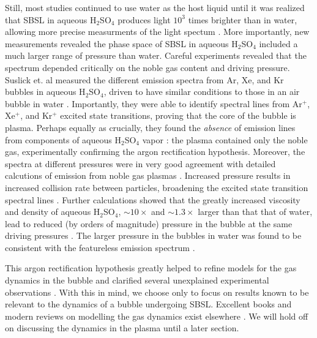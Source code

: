 \documentclass[rmp,aps,nofootinbib,superscriptaddress,floatfix]{revtex4-2}
\begin{document}
Still, most studies continued to use water as the host liquid until it was realized that SBSL in aqueous H$_2$SO$_4$ produces light $10^3$ times brighter than in water, allowing more precise measurments of the light spectum \cite{}. More importantly, new measurements revealed the phase space of SBSL in aqueous H$_2$SO$_4$ included a much larger range of pressure than water. Careful experiments revealed that the spectrum depended critically on the noble gas content and driving pressure. Suslick et. al measured the different emission spectra from Ar, Xe, and Kr bubbles in aqueous H$_2$SO$_4$, driven to have similar conditions to those in an air bubble in water \cite{flannigan2005plasma,flannigan2006measurement,suslick2008inside}. Importantly, they were able to identify spectral lines from Ar$^+$, Xe$^+$, and Kr$^+$ excited state transitions, proving that the core of the bubble is plasma. Perhaps equally as crucially, they found the \emph{absence} of emission lines from components of aqueous H$_2$SO$_4$ vapor \cite{suslick2008inside,flannigan2006measurement,flannigan2006measurement}: the plasma contained only the noble gas, experimentally confirming the argon rectification hypothesis. Moreover, the spectra at different pressures were in very good agreement with detailed calcutions of emission from noble gas plasmas \cite{an2009diagnosing,an2008spectral}. Increased pressure results in increased collision rate between particles, broadening the excited state transition spectral lines \cite{an2008spectral,suslick2008inside,flannigan2005plasma,flannigan2006measurement}. Further calculations showed that the greatly increased viscosity and density of aqueous H$_2$SO$_4$, $\sim 10 \times$ and $\sim 1.3 \times$ larger than that that of water, lead to reduced (by orders of magnitude) pressure in the bubble at the same driving pressures \cite{an2009diagnosing}. The larger pressure in the bubbles in water was found to be consistent with the featureless emission spectrum \cite{suslick2008inside,yasui2018acoustic}.

This argon rectification hypothesis greatly helped to refine models for the gas dynamics in the bubble and clarified several unexplained experimental observations \cite{suslick2008inside,brenner2002single}. With this in mind, we choose only to focus on results known to be relevant to the dynamics of a bubble undergoing SBSL. Excellent books and modern reviews on modelling the gas dynamics exist elsewhere \cite{brenner2002single,yasui2018acoustic,brennen2014cavitation}. We will hold off on discussing the dynamics in the plasma until a later section. 
\end{document}
